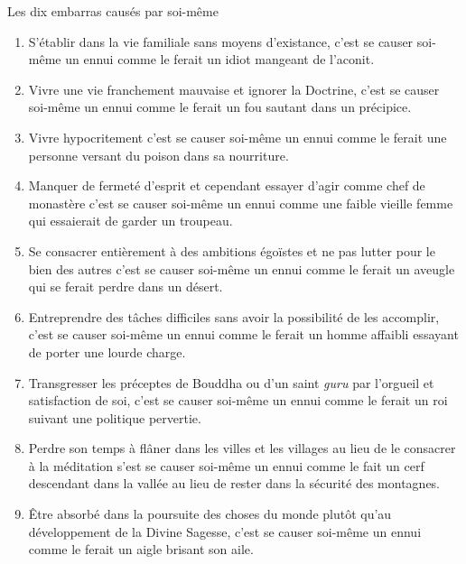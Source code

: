 \documentclass[10pt]{book}
\makeatletter
\renewcommand{\section}{\@startsection{section}{0}{0mm}
   {\baselineskip}
   {\baselineskip}{\normalfont\normalsize\scshape\centering}
}
\makeatother
\begin{document}
\section{Les dix embarras causés par soi-même}
\begin{enumerate}[1.-]
\item S'établir dans la vie familiale sans moyens d'existance, c'est se causer soi-même un ennui comme le ferait un idiot mangeant de l'aconit.
\item Vivre une vie franchement mauvaise et ignorer la Doctrine, c'est se causer soi-même un ennui comme le ferait un fou sautant dans un précipice.
\item Vivre hypocritement c'est se causer soi-même un ennui comme le ferait une personne versant du poison dans sa nourriture.
\item Manquer de fermeté d'esprit et cependant essayer d'agir comme chef de monastère c'est se causer soi-même un ennui comme une faible vieille femme qui essaierait de garder un troupeau.
\item Se consacrer entièrement à des ambitions égoïstes et ne pas lutter pour le bien des autres c'est se causer soi-même un ennui comme le ferait un aveugle qui se ferait perdre dans un désert.
\item Entreprendre des tâches difficiles sans avoir la possibilité de les accomplir, c'est se causer soi-même un ennui comme le ferait un homme affaibli essayant de porter une lourde charge.
\item Transgresser les préceptes de Bouddha ou d'un saint \textit{guru} par l'orgueil et satisfaction de soi, c'est se causer soi-même un ennui comme le ferait un roi suivant une politique pervertie.
\item Perdre son temps à flâner dans les villes et les villages au lieu de le consacrer à la méditation s'est se causer soi-même un ennui comme le fait un cerf descendant dans la vallée au lieu de rester dans la sécurité des montagnes.
\item Être absorbé dans la poursuite des choses du monde plutôt qu'au développement de la Divine Sagesse, c'est se causer soi-même un ennui comme le ferait un aigle brisant son aile.

\end{enumerate}
\end{document}
